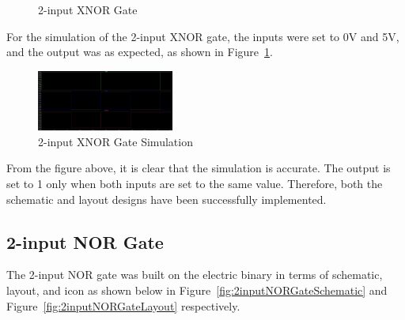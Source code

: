 \documentclass[conference]{IEEEtran}
\begin{document}
\begin{figure}[h]
    \centering
    \hfill
    \caption{2-input XNOR Gate}
\end{figure}

For the simulation of the 2-input XNOR gate, the inputs were set to 0V and 5V, and the output was as expected, as shown in Figure~\ref{fig:2inputXNORGateSimulation}.
\begin{figure}[h]
    \centering
    \includegraphics[width=0.4\textwidth]{assets/2inputXNORGateSimulation.jpg}
    \caption{2-input XNOR Gate Simulation}
    \label{fig:2inputXNORGateSimulation}
\end{figure}

From the figure above, it is clear that the simulation is accurate. The output is set to 1 only when both inputs are set to the same value. Therefore, both the schematic and layout designs have been successfully implemented.

\subsection{2-input NOR Gate}
The 2-input NOR gate was built on the electric binary in terms of schematic, layout, and icon as shown below in Figure~\ref{fig:2inputNORGateSchematic} and Figure~\ref{fig:2inputNORGateLayout} respectively.
\end{document}
